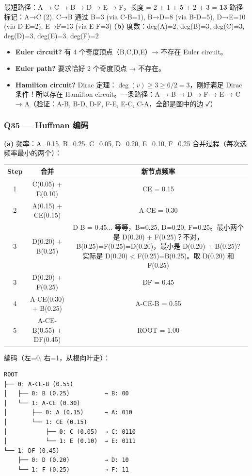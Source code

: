 \documentclass[10pt,a4paper,openany]{ctexbook}
\theoremstyle{definition}
\theoremstyle{remark}
\begin{document}
最短路径：A → C → B → D → E → F，长度 = 2 + 1 + 5 + 2 + 3 = \textbf{13}
路径标记：A→C (2), C→B 通过 B=3 (via C-B=1), B→D=8 (via B-D=5), D→E=10 (via D-E=2), E→F=13 (via E-F=3)
\textbf{(b)}
度数：deg(A)=2, deg(B)=3, deg(C)=3, deg(D)=3, deg(E)=3, deg(F)=2
\begin{itemize}
\item \textbf{Euler circuit?} 有 4 个奇度顶点（B,C,D,E）→ 不存在 Euler circuit。
\item \textbf{Euler path?} 要求恰好 2 个奇度顶点 → 不存在。
\item \textbf{Hamilton circuit?} Dirac 定理：$\deg(v) \ge 3 \ge 6/2 = 3$，刚好满足 Dirac 条件！所以存在 Hamilton circuit。一条路径：A → B → D → F → E → C → A（验证：A-B, B-D, D-F, F-E, E-C, C-A，全部是图中的边 ✓）

\end{itemize}

\vspace{-2pt}

\subsubsection{Q35 — Huffman 编码}

\textbf{(a)} 频率：A=0.15, B=0.25, C=0.05, D=0.20, E=0.10, F=0.25
合并过程（每次选频率最小的两个）：
\begin{center}
\begin{tabular}{ccc}
\hline
Step & 合并 & 新节点频率 \\ \hline
1 & C(0.05) + E(0.10) & CE = 0.15 \\
2 & A(0.15) + CE(0.15) & A-CE = 0.30 \\
3 & D(0.20) + B(0.25) & D-B = 0.45... 等等，B=0.25, D=0.20, F=0.25。最小两个是 D(0.20) + F(0.25)？不对，B(0.25)=F(0.25)=D(0.20)，最小是 D(0.20) + B(0.25)? 实际是 D(0.20) < F(0.25)=B(0.25)。取 D(0.20) 和 F(0.25) \\
3 & D(0.20) + F(0.25) & DF = 0.45 \\
4 & A-CE(0.30) + B(0.25) & A-CE-B = 0.55 \\
5 & A-CE-B(0.55) + DF(0.45) & ROOT = 1.00 \\
\hline
\end{tabular}

\end{center}

编码（左=0, 右=1，从根向叶走）：
{\footnotesize\begin{verbatim}
ROOT
├── 0: A-CE-B (0.55)
│   ├── 0: B (0.25)          → B: 00
│   └── 1: A-CE (0.30)
│       ├── 0: A (0.15)      → A: 010
│       └── 1: CE (0.15)
│           ├── 0: C (0.05)  → C: 0110
│           └── 1: E (0.10)  → E: 0111
└── 1: DF (0.45)
    ├── 0: D (0.20)          → D: 10
    └── 1: F (0.25)          → F: 11
\end{verbatim}}
\end{document}
